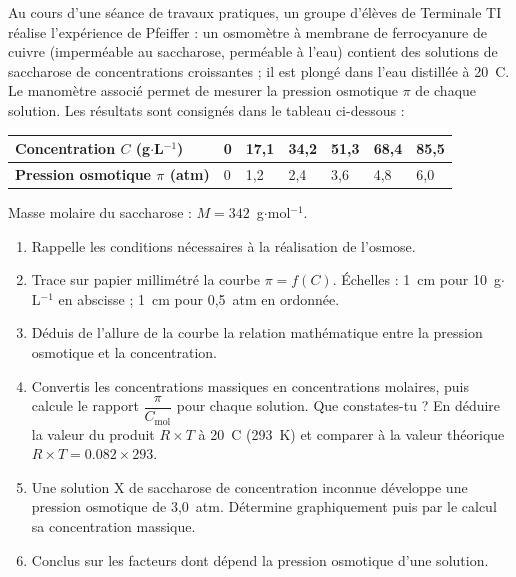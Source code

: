 \documentclass[11pt]{article}
\newcounter{popsec}
\newcounter{popsub}
\newcommand{\courssub}[1]{%
  \stepcounter{popsub}%
  \par\vspace{9pt}\noindent{\popxbold\fontsize{11.5}{13}\selectfont\color{popink}{\color{poporange}\thepopsec.\thepopsub}\hspace{6pt}#1}\par\nopagebreak\vspace{4pt}
}
\begin{document}
\courssub{Je me prépare au Bac}

\begin{exercice}
Au cours d'une séance de travaux pratiques, un groupe d'élèves de Terminale TI réalise l'expérience de Pfeiffer : un osmomètre à membrane de ferrocyanure de cuivre (imperméable au saccharose, perméable à l'eau) contient des solutions de saccharose de concentrations croissantes ; il est plongé dans l'eau distillée à 20~\textdegree C. Le manomètre associé permet de mesurer la pression osmotique $\pi$ de chaque solution. Les résultats sont consignés dans le tableau ci-dessous :

\begin{center}
\begin{tabularx}{\linewidth}{|l|*{6}{X|}}
\hline
\rowcolor{popblueL} \textbf{Concentration $C$ (g$\cdot$L$^{-1}$)} & 0 & 17,1 & 34,2 & 51,3 & 68,4 & 85,5 \\
\hline
\textbf{Pression osmotique $\pi$ (atm)} & 0 & 1,2 & 2,4 & 3,6 & 4,8 & 6,0 \\
\hline
\end{tabularx}
\end{center}

Masse molaire du saccharose : $M = 342$~g$\cdot$mol$^{-1}$.

\begin{enumerate}
\item Rappelle les conditions nécessaires à la réalisation de l'osmose.
\item Trace sur papier millimétré la courbe $\pi = f(C)$. Échelles : 1~cm pour 10~g$\cdot$L$^{-1}$ en abscisse ; 1~cm pour 0,5~atm en ordonnée.
\item Déduis de l'allure de la courbe la relation mathématique entre la pression osmotique et la concentration.
\item Convertis les concentrations massiques en concentrations molaires, puis calcule le rapport $\dfrac{\pi}{C_{\text{mol}}}$ pour chaque solution. Que constates-tu ? En déduire la valeur du produit $R \times T$ à 20~\textdegree C (293~K) et comparer à la valeur théorique $R \times T = \num{0,082} \times 293$.
\item Une solution X de saccharose de concentration inconnue développe une pression osmotique de 3,0~atm. Détermine graphiquement puis par le calcul sa concentration massique.
\item Conclus sur les facteurs dont dépend la pression osmotique d'une solution.
\end{enumerate}
\end{exercice}
\end{document}
